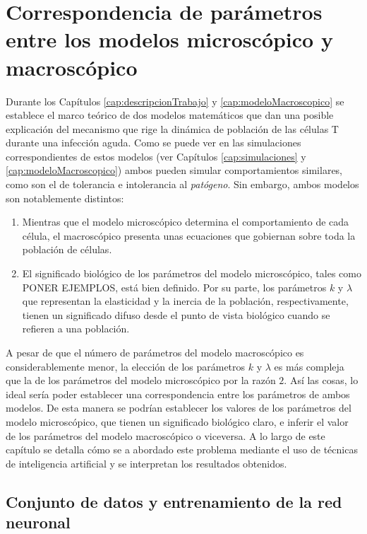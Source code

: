 \chapter{Correspondencia de parámetros entre los modelos microscópico y macroscópico}
\label{cap:redNeuronal}

Durante los Capítulos \ref{cap:descripcionTrabajo} y \ref{cap:modeloMacroscopico} se establece el marco teórico de dos modelos matemáticos que dan una posible explicación del mecanismo que rige la dinámica de población de las células T durante una infección aguda. Como se puede ver en las simulaciones correspondientes de estos modelos (ver Capítulos \ref{cap:simulaciones} y \ref{cap:modeloMacroscopico}) ambos pueden simular comportamientos similares, como son el de tolerancia e intolerancia al \textit{patógeno}. Sin embargo, ambos modelos son notablemente distintos: 

\begin{enumerate}
	\item Mientras que el modelo microscópico determina el comportamiento de cada célula, el macroscópico presenta unas ecuaciones que gobiernan sobre toda la población de células. 
	
	\item El significado biológico de los parámetros del modelo microscópico, tales como PONER EJEMPLOS, está bien definido. Por su parte, los parámetros $k$ y $\lambda$ que representan la elasticidad y la inercia de la población, respectivamente, tienen un significado difuso desde el punto de vista biológico cuando se refieren a una población.
	
\end{enumerate}

A pesar de que el número de parámetros del modelo macroscópico es considerablemente menor, la elección de los parámetros $k$ y $\lambda$ es más compleja que la de los parámetros del modelo microscópico por la razón $2$. Así las cosas, lo ideal sería poder establecer una correspondencia entre los parámetros de ambos modelos. De esta manera se podrían establecer los valores de los parámetros del modelo microscópico, que tienen un significado biológico claro, e inferir el valor de los parámetros del modelo macroscópico o viceversa. A lo largo de este capítulo se detalla cómo se a abordado este problema mediante el uso de técnicas de inteligencia artificial y se interpretan los resultados obtenidos. 


\section{Conjunto de datos y entrenamiento de la red neuronal}

